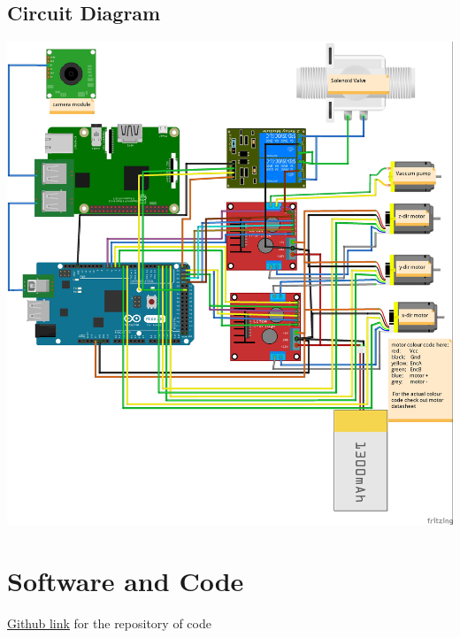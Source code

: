 \documentclass[a4paper,12pt,oneside]{book}
\begin{document}
\subsection*{Circuit Diagram}
	\begin{center}
		\includegraphics[scale=.3]{circuit_diagram_bb.jpg}
	\end{center}

\section{Software and Code}
\href{https://github.com/eYSIP-2018/CNC-for-GrowBox.git}{Github link} for the repository of code
\end{document}
